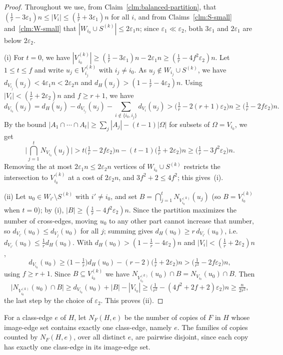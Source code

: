 \documentclass[11pt,a4paper]{article}
\theoremstyle{definition}
\theoremstyle{plain}
\newcommand{\eps}{\varepsilon}
\renewcommand{\le}{\leqslant}
\renewcommand{\ge}{\geqslant}
\begin{document}
\begin{proof}
Throughout we use, from Claim~\ref{clm:balanced-partition}, that
$(\frac1r-3\eps_1)n\le|V_i|\le(\frac1r+3\eps_1)n$ for all $i$, and from
Claims~\ref{clm:S-small} and~\ref{clm:W-small} that $|W_{i_0}\cup S^{(k)}|\le2\eps_1n$;
since $\eps_1\ll\eps_2$, both $3\eps_1$ and $2\eps_1$ are below $2\eps_2$.

(i) For $t=0$, we have $|V_{i_0}^{(k)}|\ge(\frac1r-3\eps_1)n-2\eps_1n\ge(\frac1r-4f^2\eps_2)n$.
Let $1\le t\le f$ and write $u_j\in V_{i_j}^{(k)}$ with $i_j\ne i_0$. As
$u_j\notin W_{i_j}\cup S^{(k)}$, we have $d_{V_{i_j}}(u_j)<4\eps_1n<2\eps_2n$ and
$d_H(u_j)>(1-\frac1r-4\eps_2)n$. Using $|V_i|<(\frac1r+2\eps_2)n$ and $f\ge r+1$, we have 
\[
  d_{V_{i_0}}(u_j)=d_H(u_j)-d_{V_{i_j}}(u_j)-\sum_{i\notin\{i_0,i_j\}}d_{V_i}(u_j)
>\Big(\tfrac1r-2(r+1)\eps_2\Big)n\ge\Big(\tfrac1r-2f\eps_2\Big)n.
\]
By the bound $|A_1\cap\cdots\cap A_t|\ge\sum_j|A_j|-(t-1)|\Omega|$ for subsets of $\Omega=V_{i_0}$, we get 
\[
  \Big|\bigcap_{j=1}^t N_{V_{i_0}}(u_j)\Big|
  >t\Big(\tfrac1r-2f\eps_2\Big)n-(t-1)\Big(\tfrac1r+2\eps_2\Big)n
  \ge\Big(\tfrac1r-3f^2\eps_2\Big)n.
\]
Removing the at most $2\eps_1n\le2\eps_2n$ vertices of $W_{i_0}\cup S^{(k)}$ restricts the
intersection to $V_{i_0}^{(k)}$ at a cost of $2\eps_2n$, and $3f^2+2\le4f^2$; this gives~(i).

(ii) Let $u_0\in W_{i'}\setminus S^{(k)}$ with $i'\ne i_0$, and set
$B=\bigcap_{j=1}^t N_{V_{i_0}^{(k)}}(u_j)$ (so $B=V_{i_0}^{(k)}$ when $t=0$); by (i),
$|B|\ge(\frac1r-4f^2\eps_2)n$. Since the partition maximizes the number of cross-edges, moving
$u_0$ to any other part cannot increase that number, so $d_{V_{i'}}(u_0)\le d_{V_j}(u_0)$ for all
$j$; summing gives $d_H(u_0)\ge r\,d_{V_{i'}}(u_0)$, i.e.\ $d_{V_{i'}}(u_0)\le\frac1r d_H(u_0)$.
With $d_H(u_0)>(1-\frac1r-4\eps_2)n$ and $|V_i|<(\frac1r+2\eps_2)n$,
\[
  d_{V_{i_0}}(u_0)\ge\Big(1-\tfrac1r\Big)d_H(u_0)-(r-2)\Big(\tfrac1r+2\eps_2\Big)n
  >\Big(\tfrac1{r^2}-2f\eps_2\Big)n,
\]
using $f\ge r+1$. Since $B\subseteq V_{i_0}^{(k)}$ we have
$N_{V_{i_0}^{(k)}}(u_0)\cap B=N_{V_{i_0}}(u_0)\cap B$. Then 
\[
  \Big|N_{V_{i_0}^{(k)}}(u_0)\cap B\Big|\ge d_{V_{i_0}}(u_0)+|B|-|V_{i_0}|
  \ge\Big(\tfrac1{r^2}-(4f^2+2f+2)\eps_2\Big)n\ge 
  \tfrac{n}{2r^2},
\]
the last step by the choice of $\eps_2$. This proves (ii).
\end{proof}

For a class-edge $e$ of $H$, let $N_F(H, e)$ be the number of
copies of $F$ in $H$ whose image-edge set contains exactly one
class-edge, namely $e$. The families of copies counted by $N_F(H, e)$, over all distinct $e$, are pairwise disjoint, since each copy has exactly one class-edge in its image-edge set. 
\end{document}
